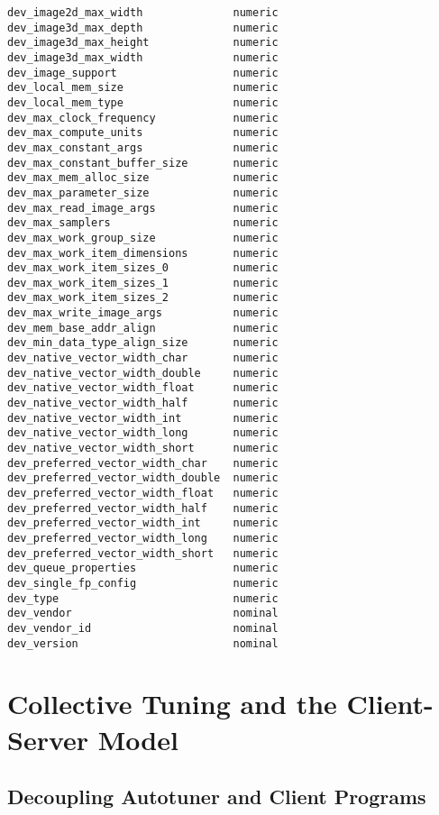 \begin{multicols}{2}
\begin{Verbatim}[fontsize=\footnotesize]
dev_image2d_max_width              numeric
dev_image3d_max_depth              numeric
dev_image3d_max_height             numeric
dev_image3d_max_width              numeric
dev_image_support                  numeric
dev_local_mem_size                 numeric
dev_local_mem_type                 numeric
dev_max_clock_frequency            numeric
dev_max_compute_units              numeric
dev_max_constant_args              numeric
dev_max_constant_buffer_size       numeric
dev_max_mem_alloc_size             numeric
dev_max_parameter_size             numeric
dev_max_read_image_args            numeric
dev_max_samplers                   numeric
dev_max_work_group_size            numeric
dev_max_work_item_dimensions       numeric
dev_max_work_item_sizes_0          numeric
dev_max_work_item_sizes_1          numeric
dev_max_work_item_sizes_2          numeric
dev_max_write_image_args           numeric
dev_mem_base_addr_align            numeric
dev_min_data_type_align_size       numeric
dev_native_vector_width_char       numeric
dev_native_vector_width_double     numeric
dev_native_vector_width_float      numeric
dev_native_vector_width_half       numeric
dev_native_vector_width_int        numeric
dev_native_vector_width_long       numeric
dev_native_vector_width_short      numeric
dev_preferred_vector_width_char    numeric
dev_preferred_vector_width_double  numeric
dev_preferred_vector_width_float   numeric
dev_preferred_vector_width_half    numeric
dev_preferred_vector_width_int     numeric
dev_preferred_vector_width_long    numeric
dev_preferred_vector_width_short   numeric
dev_queue_properties               numeric
dev_single_fp_config               numeric
dev_type                           numeric
dev_vendor                         nominal
dev_vendor_id                      nominal
dev_version                        nominal
\end{Verbatim}
\end{multicols}


\section{Collective Tuning and the Client-Server Model}


\subsection{Decoupling Autotuner and Client Programs}

